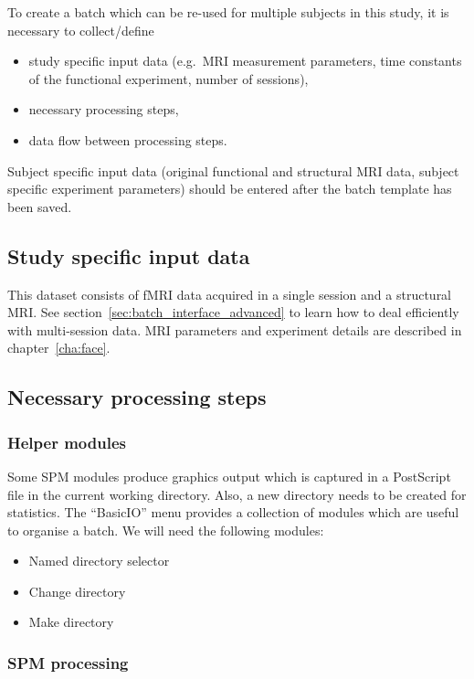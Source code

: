 To create a batch which can be re-used for multiple subjects in this study, it
is necessary to collect/define
\begin{itemize}
\item study specific input data (e.g.\ MRI measurement parameters, time
  constants of the functional experiment, number of sessions),
\item necessary processing steps,
\item data flow between processing steps.
\end{itemize}
Subject specific input data (original functional and structural MRI data,
subject specific experiment parameters) should be entered after the batch
template has been saved.

\subsection{Study specific input data}

This dataset consists of fMRI data acquired in a single session and a
structural MRI. See section~\ref{sec:batch_interface_advanced} to learn how to
deal efficiently with multi-session data. MRI parameters and experiment
details are described in chapter~\ref{cha:face}.

\subsection{Necessary processing steps}

\subsubsection{Helper modules}

Some SPM modules produce graphics output which is captured in a PostScript
file in the current working directory. Also, a new directory needs to be
created for statistics. The ``BasicIO'' menu provides a collection of modules
which are useful to organise a batch. We will need the following modules:

\begin{itemize}
\item Named directory selector
\item Change directory
\item Make directory
\end{itemize}

\subsubsection{SPM processing}

